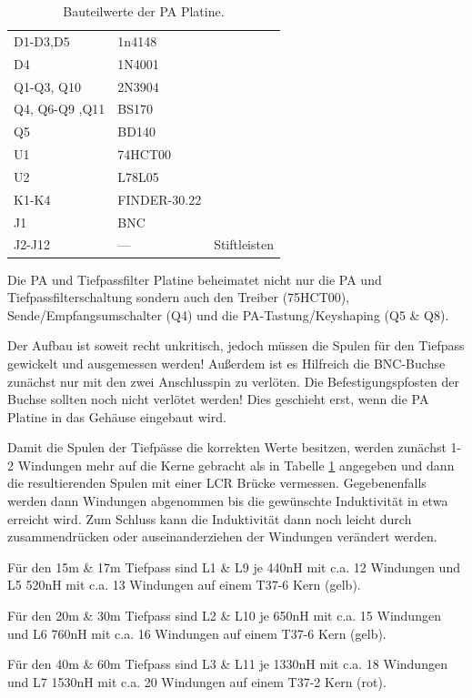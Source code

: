 \documentclass[10pt, a4paper]{paper}
\newcommand{\warn}[1]{{\color{red} #1}}
\begin{document}
\begin{table}
\begin{tabular}{|p{3cm}|p{2cm}|p{2cm}|}
 D1-D3,D5 & 1n4148 & \\
 D4 & 1N4001 & \\

 Q1-Q3, Q10 & 2N3904 & \\
 Q4, Q6-Q9 ,Q11 & BS170 & \\
 Q5 & BD140 & \\

 U1 & 74HCT00 & \\
 U2 & L78L05 & \\

 K1-K4 & FINDER-30.22 & \\

 J1 & BNC & \\

 J2-J12 & --- & Stiftleisten \\ \hline
 \end{tabular}
 \caption{Bauteilwerte der PA Platine.} \label{tab:pa}
\end{table}

Die PA und Tiefpassfilter Platine beheimatet nicht nur die PA und Tiefpassfilterschaltung sondern auch den Treiber (75HCT00), Sende/Empfangsumschalter (Q4) und die PA-Tastung/Keyshaping (Q5 \& Q8).

Der Aufbau ist soweit recht unkritisch, \warn{jedoch müssen die Spulen für den Tiefpass gewickelt und ausgemessen werden!} Außerdem ist es Hilfreich die BNC-Buchse zunächst nur mit den zwei Anschlusspin zu verlöten. \warn{Die Befestigungspfosten der Buchse sollten noch nicht verlötet werden!} Dies geschieht erst, wenn die PA Platine in das Gehäuse eingebaut wird. 

Damit die Spulen der Tiefpässe die korrekten Werte besitzen, werden zunächst 1-2 Windungen mehr auf die Kerne gebracht als in Tabelle \ref{tab:pa} angegeben und dann die resultierenden Spulen mit einer LCR Brücke vermessen. Gegebenenfalls werden dann Windungen abgenommen bis die gewünschte Induktivität in etwa erreicht wird. Zum Schluss kann die Induktivität dann noch leicht durch zusammendrücken oder auseinanderziehen der Windungen verändert werden. 

Für den 15m \& 17m Tiefpass sind L1 \& L9 je 440nH mit c.a. 12 Windungen und L5 520nH mit c.a. 13 Windungen auf einem T37-6 Kern (gelb). 

Für den 20m \& 30m Tiefpass sind L2 \& L10 je 650nH mit c.a. 15 Windungen und L6 760nH mit c.a. 16 Windungen auf einem T37-6 Kern (gelb).

Für den 40m \& 60m Tiefpass sind L3 \& L11 je 1330nH mit c.a. 18 Windungen und L7 1530nH mit c.a. 20 Windungen auf einem T37-2 Kern (rot).
\end{document}
